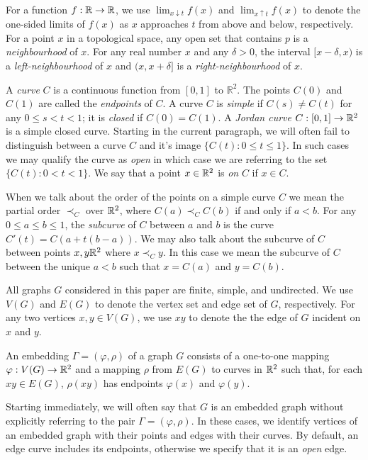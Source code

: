 \documentclass{patmorin}
\begin{document}
For a function $f:\mathbb{R}\to\mathbb{R}$, we use $\lim_{x\downarrow t} f(x)$ and
$\lim_{x\uparrow t} f(x)$ to denote the one-sided limits of $f(x)$
as $x$ approaches $t$ from above and below, respectively.  For a
point $x$ in a topological space, any open set that contains $p$ is a
\emph{neighbourhood} of $x$.  For any real number $x$ and any $\delta>0$,
the interval $[x-\delta,x)$ is a \emph{left-neighbourhood} of $x$ and
$(x,x+\delta]$ is a \emph{right-neighbourhood} of $x$.

A \emph{curve} $C$ is a continuous function from $[0,1]$
to $\mathbb{R}^2$.  The points $C(0)$ and $C(1)$ are called the
\emph{endpoints} of $C$.  A curve $C$ is \emph{simple} if $C(s)\neq C(t)$
for any $0\le s<t< 1$; it is \emph{closed} if $C(0)=C(1)$.  A \emph{Jordan
curve} $C:[0,1]\to\mathbb{R}^2$ is a simple closed curve.     Starting in the
current paragraph, we will often fail to distinguish between a curve $C$
and it's image $\{C(t):0\le t\le 1\}$.  In such cases we may qualify the
curve as \emph{open} in which case we are referring to the set $\{C(t):0<
t< 1\}$.  We say that a point $x\in\mathbb{R}^2$ is \emph{on} $C$ if $x\in C$.

When we talk about the order of the points on a simple curve $C$ we
mean the partial order $\prec_C$ over $\mathbb{R}^2$, where $C(a)\prec_C C(b)$
if and only if $a<b$.  For any $0\le a\le b\le 1$, the \emph{subcurve}
of $C$ between $a$ and $b$ is the curve $C'(t)=C(a+t(b-a))$.  We may also
talk about the subcurve of $C$ between points $x,y\mathbb{R}^2$ where $x\prec_C
y$. In this case we mean the subcurve of $C$ between the unique $a< b$
such that $x=C(a)$ and $y=C(b)$.

All graphs $G$ considered in this paper are finite, simple, and
undirected.   We use $V(G)$ and $E(G)$ to denote the vertex set and edge
set of $G$, respectively. For any two vertices $x,y\in V(G)$, we use $xy$
to denote the the edge of $G$ incident on $x$ and $y$.

An embedding $\Gamma=(\varphi,\rho)$ of a graph $G$ consists
of a one-to-one mapping $\varphi:V(G)\to\mathbb{R}^2$ and a mapping $\rho$ from
$E(G)$ to curves in $\mathbb{R}^2$ such that, for each $xy\in E(G)$, $\rho(xy)$
has endpoints $\varphi(x)$ and $\varphi(y)$.

Starting immediately,  we will often say that $G$ is an embedded graph
without explicitly referring to the pair $\Gamma=(\varphi,\rho)$.
In these cases, we identify vertices of an embedded graph with their
points and edges with their curves. By default, an edge curve includes
its endpoints, otherwise we specify that it is an \emph{open} edge.
\end{document}
